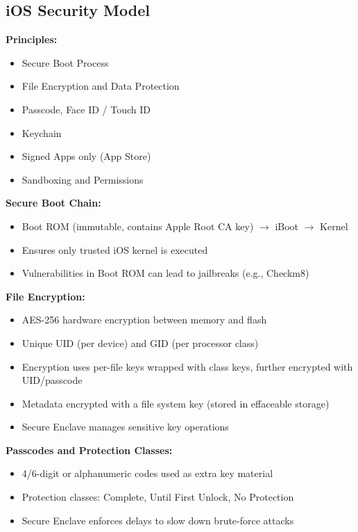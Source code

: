 \subsection{iOS Security Model}
{
\textbf{Principles:}
\begin{itemize}[noitemsep]
  \item Secure Boot Process
  \item File Encryption and Data Protection
  \item Passcode, Face ID / Touch ID
  \item Keychain
  \item Signed Apps only (App Store)
  \item Sandboxing and Permissions
\end{itemize}

\textbf{Secure Boot Chain:}
\begin{itemize}[noitemsep]
  \item Boot ROM (immutable, contains Apple Root CA key) $\rightarrow$  iBoot $\rightarrow$  Kernel
  \item Ensures only trusted iOS kernel is executed
  \item Vulnerabilities in Boot ROM can lead to jailbreaks (e.g., Checkm8)
\end{itemize}

\textbf{File Encryption:}
\begin{itemize}[noitemsep]
  \item AES-256 hardware encryption between memory and flash
  \item Unique UID (per device) and GID (per processor class)
  \item Encryption uses per-file keys wrapped with class keys, further encrypted with UID/passcode
  \item Metadata encrypted with a file system key (stored in effaceable storage)
  \item Secure Enclave manages sensitive key operations
\end{itemize}

\textbf{Passcodes and Protection Classes:}
\begin{itemize}[noitemsep]
  \item 4/6-digit or alphanumeric codes used as extra key material
  \item Protection classes: Complete, Until First Unlock, No Protection
  \item Secure Enclave enforces delays to slow down brute-force attacks
\end{itemize}

}

